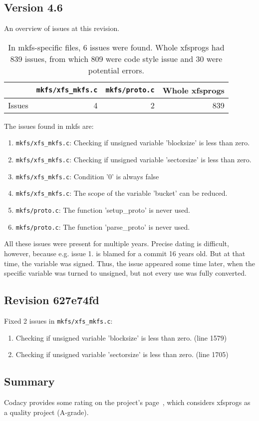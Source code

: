 \subsection{Version 4.6}

An overview of issues at this revision.
\begin{table}[h]
\begin{tabular}{|l||r|r||r|}
\hline
& {\tt mkfs/xfs\_mkfs.c} & {\tt mkfs/proto.c} & Whole xfsprogs \\
\hline
Issues & 4 & 2 & 839 \\
\hline
\end{tabular}
\caption{In mkfs-specific files, 6 issues were found. Whole
xfsprogs had 839 issues, from which 809 were code style issue and 30 were
potential errors.}
\end{table}

The issues found in mkfs are:
\begin{enumerate}
	\item {\tt mkfs/xfs\_mkfs.c}: Checking if unsigned variable 'blocksize' is less than zero.
	\item {\tt mkfs/xfs\_mkfs.c}: Checking if unsigned variable 'sectorsize' is less than zero.
	\item {\tt mkfs/xfs\_mkfs.c}: Condition '0' is always false
	\item {\tt mkfs/xfs\_mkfs.c}: The scope of the variable 'bucket' can be reduced.
	\item {\tt mkfs/proto.c}: The function 'setup\_proto' is never used.
	\item {\tt mkfs/proto.c}: The function 'parse\_proto' is never used.
\end{enumerate}

All these issues were present for multiple years. Precise dating is
difficult, however, because e.g. issue 1. is blamed for a commit 16 years
old. But at that time, the variable was signed. Thus, the issue appeared
some time later, when the specific variable was turned to unsigned, but not
every use was fully converted.



\subsection{Revision 627e74fd}
Fixed 2 issues in {\tt mkfs/xfs\_mkfs.c}:

\begin{enumerate}
\item Checking if unsigned variable 'blocksize' is less than zero. (line 1579)
\item Checking if unsigned variable 'sectorsize' is less than zero. (line
								     1705)
\end{enumerate}

\subsection{Summary}
Codacy provides some rating on the project's page~\cite{codacyXfsprogs},
which considers xfsprogs as a quality project (A-grade).

